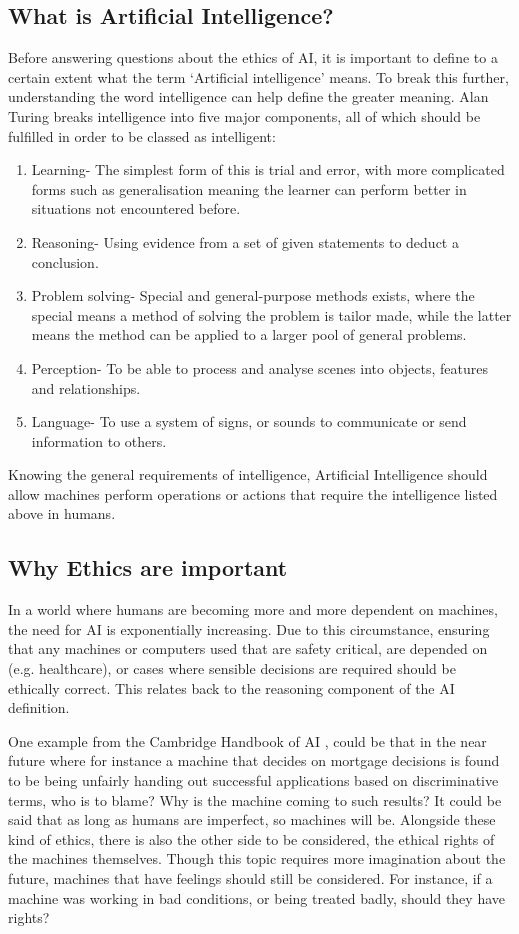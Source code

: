 \documentclass[article]{IEEEtran}
\begin{document}
\subsection{What is Artificial Intelligence?}
Before answering questions about the ethics of AI, it is important to define to a certain extent what the term ‘Artificial intelligence’ means. To break this further, understanding the word intelligence can help define the greater meaning. Alan Turing \cite{Alan Turing website} breaks intelligence into five major components, all of which should be fulfilled in order to be classed as intelligent:
\begin{enumerate}
\item Learning- The simplest form of this is trial and error, with more complicated forms such as generalisation meaning the learner can perform better in situations not encountered before.
\item Reasoning- Using evidence from a set of given statements to deduct a conclusion.
\item Problem solving- Special and general-purpose methods exists, where the special means a method of solving the problem is tailor made, while the latter means the method can be applied to a larger pool of general problems.	
\item Perception- To be able to process and analyse scenes into objects, features and relationships.
\item Language- To use a system of signs, or sounds to communicate or send information to others. 
\end{enumerate}
Knowing the general requirements of intelligence, Artificial Intelligence should allow machines perform operations or actions that require the intelligence listed above in humans.

\subsection{Why Ethics are important}
In a world where humans are becoming more and more dependent on machines, the need for AI is exponentially increasing. Due to this circumstance, ensuring that any machines or computers used that are safety critical, are depended on (e.g. healthcare), or cases where sensible decisions are required should be ethically correct. This relates back to the reasoning component of the AI definition. \par
One example from the Cambridge Handbook of AI \cite{ethics important}, could be that in the near future where for instance a machine that decides  on mortgage decisions is found to be being unfairly handing out successful applications based on discriminative terms, who is to blame? Why is the machine coming to such results? It could be said that as long as humans are imperfect, so machines will be. 
Alongside these kind of ethics, there is also the other side to be considered, the ethical rights of the machines themselves. Though this topic requires more imagination about the future, machines that have feelings should still be considered. For instance, if a machine was working in bad conditions, or being treated badly, should they have rights?  
\end{document}
